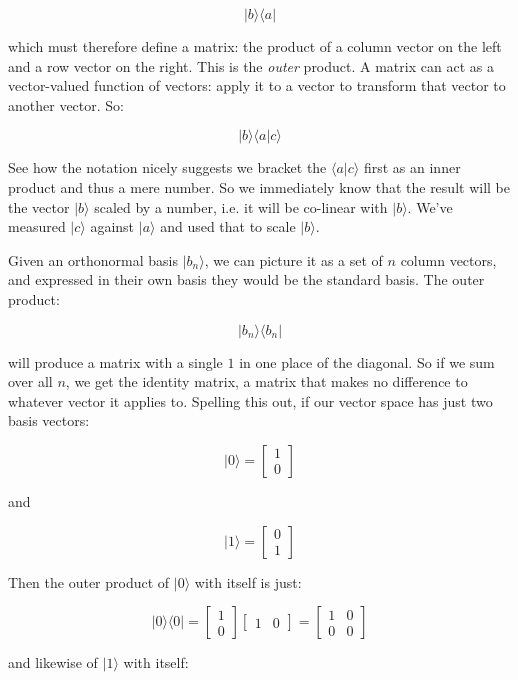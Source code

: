 $$|b \rangle \langle a |$$

which must therefore define a matrix: the product of a column vector on the left and a row vector on the right. This is the \textit{outer} product. A matrix can act as a vector-valued function of vectors: apply it to a vector to transform that vector to another vector. So:

$$|b \rangle \langle a | c \rangle$$

See how the notation nicely suggests we bracket the $\langle a | c \rangle$ first as an inner product and thus a mere number. So we immediately know that the result will be the vector $|b \rangle$ scaled by a number, i.e. it will be co-linear with $|b \rangle$. We've measured $|c \rangle$ against $|a \rangle$ and used that to scale $|b \rangle$.

Given an orthonormal basis $|b_n \rangle$, we can picture it as a set of $n$ column vectors, and expressed in their own basis they would be the standard basis. The outer product:

$$|b_n \rangle \langle b_n |$$

will produce a matrix with a single $1$ in one place of the diagonal. So if we sum over all $n$, we get the identity matrix, a matrix that makes no difference to whatever vector it applies to. Spelling this out, if our vector space has just two basis vectors:

$$|0 \rangle = \begin{bmatrix} 1 \\ 0 \end{bmatrix}$$

and

$$|1 \rangle = \begin{bmatrix} 0 \\ 1 \end{bmatrix}$$

Then the outer product of $|0 \rangle$ with itself is just:

$$
|0 \rangle \langle 0| = 
\begin{bmatrix} 1 \\ 0 \end{bmatrix}
\begin{bmatrix} 1 & 0 \end{bmatrix} =
\begin{bmatrix} 1 & 0 \\ 0 & 0 \end{bmatrix}
$$

and likewise of $|1 \rangle$ with itself:

